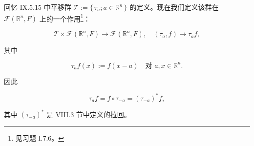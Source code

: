 回忆 IX.5.15 中平移群 $ \mathcal{T} := \{\, \tau_{a} ; a \in \mathbb{R}^{n} \,\} $ 的定义。现在我们定义该群在 $ \mathcal{F}(\mathbb{R}^{n},F) $ 上的一个作用\footnote{见习题 I.7.6。}：

\begin{equation}
\mathcal{T} \times \mathcal{F}(\mathbb{R}^{n},F) \to \mathcal{F}(\mathbb{R}^{n},F) , \quad (\tau_{a},f) \mapsto \tau_{a}f ,\tag{7.1}
\end{equation}

其中

\begin{equation}
\tau_{a}f(x) := f(x-a) \quad \text{对 } a, x \in \mathbb{R}^{n} .\tag{7.2}
\end{equation}

因此

\[
\tau_{a}f = f \circ \tau_{-a} = (\tau_{-a})^{\ast}f ,
\]

其中 $ (\tau_{-a})^{\ast} $ 是 VIII.3 节中定义的拉回。

